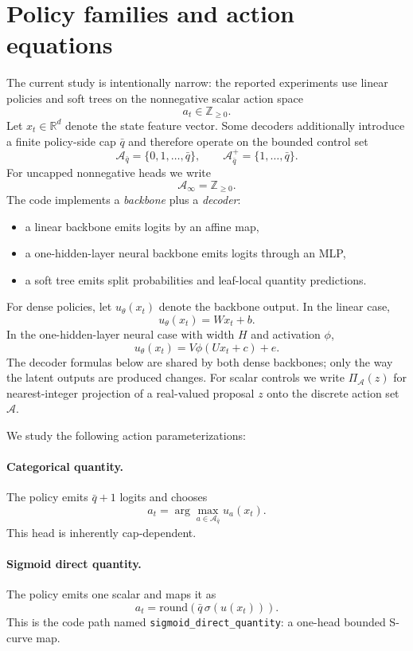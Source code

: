 \documentclass[11pt]{article}
\begin{document}
\section{Policy families and action equations}

The current study is intentionally narrow: the reported experiments use linear policies and soft
trees on the nonnegative scalar action space
\[
a_t \in \mathbb{Z}_{\ge 0}.
\]
Let $x_t \in \mathbb{R}^d$ denote the state feature vector. Some decoders additionally introduce a
finite policy-side cap $\bar q$ and therefore operate on the bounded control set
\[
\mathcal{A}_{\bar q} = \{0,1,\ldots,\bar q\},
\qquad
\mathcal{A}_{\bar q}^{+} = \{1,\ldots,\bar q\}.
\]
For uncapped nonnegative heads we write
\[
\mathcal{A}_{\infty} = \mathbb{Z}_{\ge 0}.
\]
The code implements a \emph{backbone} plus a \emph{decoder}:
\begin{itemize}
    \item a linear backbone emits logits by an affine map,
    \item a one-hidden-layer neural backbone emits logits through an MLP,
    \item a soft tree emits split probabilities and leaf-local quantity predictions.
\end{itemize}

For dense policies, let $u_\theta(x_t)$ denote the backbone output. In the linear case,
\[
u_\theta(x_t) = W x_t + b.
\]
In the one-hidden-layer neural case with width $H$ and activation $\phi$,
\[
u_\theta(x_t) = V \phi(Ux_t + c) + e.
\]
The decoder formulas below are shared by both dense backbones; only the way the latent outputs are
produced changes. For scalar controls we write $\Pi_{\mathcal{A}}(z)$ for nearest-integer
projection of a real-valued proposal $z$ onto the discrete action set $\mathcal{A}$.

We study the following action parameterizations:

\paragraph{Categorical quantity.}
The policy emits $\bar q+1$ logits and chooses
\[
a_t = \arg\max_{a \in \mathcal{A}_{\bar q}} u_a(x_t).
\]
This head is inherently cap-dependent.

\paragraph{Sigmoid direct quantity.}
The policy emits one scalar and maps it as
\[
a_t = \mathrm{round}\!\left(\bar q \, \sigma(u(x_t))\right).
\]
This is the code path named \texttt{sigmoid\_direct\_quantity}: a one-head bounded S-curve map.
\end{document}
